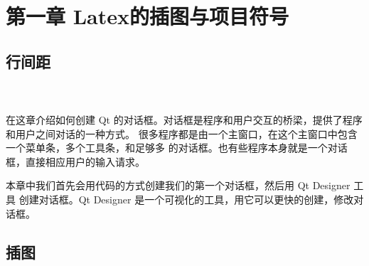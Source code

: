 \section{\color[rgb]{0.2,0.4,0.6} {第一章 Latex的插图与项目符号}}
\subsection{行间距}
\begin{spacing}{2.0} %
\paragraph{ \ \ } 在这章介绍如何创建 Qt 的对话框。对话框是程序和用户交互的桥梁，提供了程序和用户之间对话的一种方式。
很多程序都是由一个主窗口，在这个主窗口中包含一个菜单条，多个工具条，和足够多
的对话框。也有些程序本身就是一个对话框，直接相应用户的输入请求。
\par 本章中我们首先会用代码的方式创建我们的第一个对话框，然后用 Qt Designer 工具
创建对话框。Qt Designer 是一个可视化的工具，用它可以更快的创建，修改对话框。
\end{spacing}
\subsection{插图}

